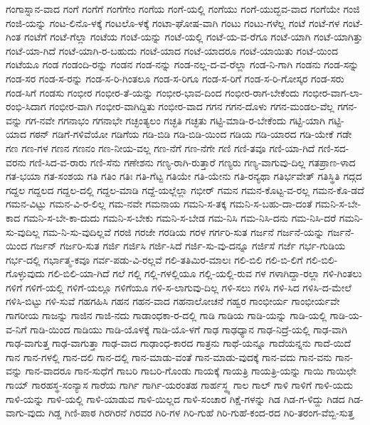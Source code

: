 {ಗಂಗಾಸ್ನಾನ-ವಾದ
ಗಂಗೆ
ಗಂಗೆಗೆ
ಗಂಗೆಗೇಂ
ಗಂಗೆಯ
ಗಂಗೆ-ಯಲ್ಲಿ
ಗಂಗೆಯು
ಗಂಗೆ-ಯುದ್ಭವ-ವಾದ
ಗಂಗೆಯೇ
ಗಂಜಿ
ಗಂಜಿ-ಯನ್ನು
ಗಂಟ-ಲಿನೊ-ಳಕ್ಕೆ
ಗಂಟಲೊ-ಳಕ್ಕೆ
ಗಂಟಾ-ಘೋಷ-ವಾಗಿ
ಗಂಟು
ಗಂಟು-ಗಳೆಲ್ಲ
ಗಂಟೆ
ಗಂಟೆ-ಗಳ
ಗಂಟೆ-ಗಿಂತ
ಗಂಟೆಗೆ
ಗಂಟೆ-ಗೆಲ್ಲಾ
ಗಂಟೆಯ
ಗಂಟೆ-ಯನ್ನು
ಗಂಟೆ-ಯಲ್ಲಿ
ಗಂಟೆ-ಯ-ವ-ರೆಗೂ
ಗಂಟೆ-ಯಾಗಿ
ಗಂಟೆ-ಯಾಗಿತ್ತು
ಗಂಟೆ-ಯಾ-ಗಿದೆ
ಗಂಟೆ-ಯಾಗಿ-ರ-ಬಹುದು
ಗಂಟೆ-ಯಾದ
ಗಂಟೆ-ಯಾದರೂ
ಗಂಟೆ-ಯಾಯಿತು
ಗಂಟೆ-ಯಿಂದ
ಗಂಟೆಯೂ
ಗಂಡ
ಗಂಡಂದಿ-ರನ್ನು
ಗಂಡನ
ಗಂಡ-ನನ್ನು
ಗಂಡ-ನಲ್ಲ-ದ-ವ-ರೆಲ್ಲಾ
ಗಂಡ-ನಿ-ಗಾಗಿ
ಗಂಡನು
ಗಂಡ-ಸನ್ನು
ಗಂಡ-ಸರ
ಗಂಡ-ಸ-ರನ್ನು
ಗಂಡ-ಸ-ರಿ-ಗಿಂತಲೂ
ಗಂಡ-ಸ-ರಿಗೂ
ಗಂಡ-ಸ-ರಿಗೆ
ಗಂಡ-ಸ-ರಿ-ಗೋಸ್ಕರ
ಗಂಡ-ಸರು
ಗಂಡ-ಸಿಗೆ
ಗಂಡಸು
ಗಂಭೀರ
ಗಂಭೀರ-ತೆ-ಯನ್ನು
ಗಂಭೀರ-ಭಾವ-ದಿಂದ
ಗಂಭೀರ-ರಾಗ-ಬೇಕೆಂದು
ಗಂಭೀರ-ವಾಗ-ಲಾ-ರಂಭಿ-ಸಿದಾಗ
ಗಂಭೀರ-ವಾಗಿ
ಗಂಭೀರ-ವಾಗಿದ್ದಿತು
ಗಂಭೀರ-ವಾದ
ಗಗನ
ಗಗನ-ದೊಳು
ಗಗನ-ಮಂಡಲ-ವೆಲ್ಲ
ಗಗನ-ವನ್ನು
ಗಗ-ನವೇ
ಗಗನಾಭಂ
ಗಗನಾಭೇ
ಗಚ್ಛಂತ್ಯಲಂ
ಗಚ್ಛತಿ
ಗಚ್ಛತು
ಗಟ್ಟಿ-ಮಾಡಿ-ರ-ಬೇಕೆಂದು
ಗಟ್ಟಿ-ಯಾಗಿ
ಗಟ್ಟಿ-ಯಾದ
ಗಠನ್
ಗಡಿಗೆ-ಗಳಿವೆಯೋ
ಗಡಿಗೆಯ
ಗಡಿ-ಬಿಡಿ
ಗಡಿ-ಬಿಡಿ-ಯಿಂದ
ಗಡಿಯ
ಗಡಿ-ಯಾರದ
ಗಡಿ-ಯೇಕೆ
ಗಡೇ
ಗಣ
ಗಣ-ಗಳ
ಗಣನ
ಗಣನಂ
ಗಣ-ನೀಯ-ವಲ್ಲ
ಗಣ-ನೆಗೆ
ಗಣ-ನೆಗೇ
ಗಣಿ
ಗಣಿ-ತವೂ
ಗಣಿ-ಯಾ-ಗಿದೆ
ಗಣಿ-ಸದ-ವರನು
ಗಣಿ-ಸಿದ-ವ-ರಾರು
ಗಣಿ-ಸೆನು
ಗಣೇಶನು
ಗಣ್ಯ-ರಾಗಿ-ರುತ್ತಾರೆ
ಗಣ್ಯರು
ಗಣ್ಯ-ವಾಗುವು-ದಿಲ್ಲ
ಗತಪ್ರಾಣ-ಳಾದ
ಗತ-ಭಯಾ
ಗತ-ಸಂಶಯ
ಗತಿ
ಗತಿಂ
ಗತಿಃ
ಗತಿ-ಗೆಟ್ಟ
ಗತಿಯೇ
ಗತಿ-ಯೇನು
ಗತಿ-ರನ್ಯಥಾ
ಗತಿರ್ಭವೇತ್
ಗತಿಸ್ಥಿತಿ
ಗದ್ಗದ
ಗದ್ದಲ
ಗದ್ದಲದ
ಗದ್ದಲ-ದಲ್ಲಿ
ಗದ್ದಲ-ಮಾಡಿ
ಗದ್ದೆ-ಯಲ್ಲೆಲ್ಲಾ
ಗಭೀರ್
ಗಮನ
ಗಮನ-ಕೊಟ್ಟ-ವ-ರಲ್ಲ
ಗಮನ-ಕೊ-ಡದೆ
ಗಮನ-ವಿಟ್ಟು
ಗಮನ-ವಿ-ರ-ಲಿಲ್ಲ
ಗಮ-ನವೇ
ಗಮನಾಯ
ಗಮನಿ-ಸ-ತಕ್ಕ
ಗಮನಿ-ಸ-ಬಹು-ದಾ-ದಂತೆ
ಗಮನಿ-ಸ-ಬೇ-ಕಾದ
ಗಮನಿ-ಸ-ಬೇ-ಕಾ-ದುದು
ಗಮನಿ-ಸ-ಬೇಕು
ಗಮನಿ-ಸ-ಬೇಡ
ಗಮ-ನಿಸಿ
ಗಮ-ನಿಸಿ-ದನು
ಗಮ-ನಿಸಿ-ದರೆ
ಗಮನಿ-ಸು-ವುದಿಲ್ಲ
ಗಮ-ನಿ-ಸು-ವುದಿಲ್ಲವೆ
ಗರಜಿ
ಗರಜೇ
ಗರಡಿಯ
ಗರಳ
ಗರ್ಗರಿ-ಸುತ
ಗರ್ಜನೆ
ಗರ್ಜನೆ-ಯನ್ನು
ಗರ್ಜನೆ-ಯಿಂದ
ಗರ್ಜನ್
ಗರ್ಜರಿ-ಸುತ
ಗರ್ಜಿ
ಗರ್ಜಿಸಿ
ಗರ್ಜಿ-ಸಿದೆ
ಗರ್ಜಿ-ಸು-ವು-ದನ್ನೂ
ಗರ್ಜಿಸೆ
ಗರ್ಜೆ
ಗರ್ಭ-ಗುಡಿಯ
ಗರ್ಭ-ದಲ್ಲಿ
ಗರ್ಭಾತ್ಮ-ಕವೂ
ಗರ್ವ-ಪಡು-ವಿ-ರಲ್ಲವೆ
ಗಲಿ-ತತಿಮಿರ-ಮಾಲಃ
ಗಲಿ-ಬಿಲಿ
ಗಲಿ-ಬಿ-ಲಿಗೆ
ಗಲಿ-ಬಿಲಿ-ಗೊಳ್ಳುವುದು
ಗಲಿ-ಬಿಲಿ-ಯಾ-ಗಿದೆ
ಗಲೆ
ಗಲ್ಲಿ
ಗಲ್ಲಿ-ಗಳಲ್ಲಿಯೂ
ಗಲ್ಲಿ-ಯಲ್ಲಿ-ರುವ
ಗಳ
ಗಳಾಗಿದ್ದಾ-ರಲ್ಲಾ
ಗಳಿ-ಗಿಂತಲು
ಗಳಿಗೆ
ಗಳಿಗೆ-ಯಲ್ಲಿ
ಗಳಿಗೆ-ಯಲ್ಲೂ
ಗಳಿಗೆಯೂ
ಗಳಿ-ಸ-ಲಾಗುವು-ದಿಲ್ಲ
ಗಳಿ-ಸಲು
ಗಳಿಸಿ
ಗಳಿ-ಸಿದ
ಗಳಿಸಿ-ದ-ಮೇಲೆ
ಗಳಿಸಿ-ಬಿಟ್ಟು
ಗಳಿ-ಸುವೆ
ಗಹಗಹಿಸಿ
ಗಹನ
ಗಹನ-ವಾದ
ಗಹನಾಲೋಚನೆ
ಗಹ್ವರ
ಗಾಂಭೀರ್ಯ
ಗಾಂಭೀರ್ಯವೇ
ಗಾಗರೀಯ
ಗಾಜನ್ನು
ಗಾಜಿನ
ಗಾಜಿ-ನದು
ಗಾಡಾಂಧಕಾ-ರ-ದಲ್ಲಿ
ಗಾಡಿ
ಗಾಡಿಯ
ಗಾಡಿ-ಯನ್ನು
ಗಾಡಿ-ಯಲ್ಲಿ
ಗಾಡಿ-ಯ-ವ-ನಿಗೆ
ಗಾಡಿ-ಯಿಂದ
ಗಾಡಿಯು
ಗಾಡಿ-ಯೊಳಕ್ಕೆ
ಗಾಡಿ-ಯೊ-ಳಗೆ
ಗಾಢ
ಗಾಢಧ್ಯಾನ
ಗಾಢ-ನಿದ್ರೆ-ಯಲ್ಲಿ
ಗಾಢ-ವಾಗಿ
ಗಾಢ-ವಾಗುತ್ತ
ಗಾಢ-ವಾಗುತ್ತಾ
ಗಾಢ-ವಾದ
ಗಾಢಾಂಧ-ಕಾರದ
ಗಾತ್ರನು
ಗಾಥೆ-ಯನ್ನೂ
ಗಾದೆಯನ್ನನು
ಗಾದೆ-ಯಿದೆ
ಗಾನ
ಗಾನ-ಗಳಲ್ಲಿ
ಗಾನ-ದಲಿ
ಗಾನ-ದಲ್ಲಿ
ಗಾನ-ಮಾಡು-ವಂತೆ
ಗಾನ-ಮಾಡು-ವುದಕ್ಕೆ
ಗಾನ-ವದು
ಗಾನ-ವನು
ಗಾನ-ವನ್ನು
ಗಾನ-ವಾದರೂ
ಗಾನ-ಸುಧೆಗೆ
ಗಾಬರಿ
ಗಾಬರಿ-ಗೊಂಡು
ಗಾಯಕ್ಕೆ
ಗಾಯತ್ರಿ
ಗಾಯತ್ರಿ-ಯನ್ನು
ಗಾಯಿ
ಗಾಯಿಛೇ
ಗಾಯ್
ಗಾರಹಸ್ಥ-ಸಂನ್ಯಾಸ
ಗಾರೆಯ
ಗಾರ್ಗಿ
ಗಾರ್ಗಿ-ಯರಂತಹ
ಗಾರ್ಹಸ್ಥ್ಯ
ಗಾಲ
ಗಾಲ್
ಗಾಳಿ
ಗಾಳಿಗೆ
ಗಾಳಿ-ಯದು
ಗಾಳಿ-ಯನ್ನು
ಗಾಳಿ-ಯಲ್ಲಿ
ಗಾಳಿ-ಯಾಡುವ
ಗಾಳಿ-ಯಿಲ್ಲದ
ಗಾಳಿ-ಸಂಚಾರ
ಗಿಕ್ಷೆ-ಗಳನ್ನು
ಗಿಡ
ಗಿಡ-ಗ-ಳಿದ್ದು
ಗಿಡದ
ಗಿಡ-ವಾಗು-ವುದು
ಗಿಡ್ಡ
ಗಿಣಿ-ಪಾಠ
ಗಿರಗಿರನೆ
ಗಿರವರ
ಗಿರಿ-ಗಳ
ಗಿರಿ-ಗುಹೆ
ಗಿರಿ-ಗುಹೆ-ಕಂದ-ರದ
ಗಿರಿ-ತರಂಗ-ವೆಬ್ಬಿ-ಸುತ್ತ
}
